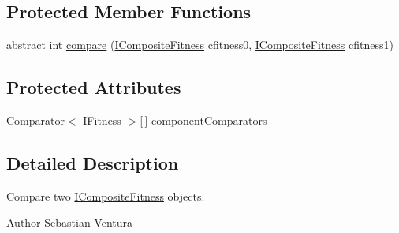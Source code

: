 \subsection*{Protected Member Functions}
\begin{DoxyCompactItemize}
\item 
abstract int \hyperlink{classnet_1_1sf_1_1jclec_1_1fitness_1_1_composite_fitness_comparator_a6c060cd511a694dc0953e42ab05a4419}{compare} (\hyperlink{interfacenet_1_1sf_1_1jclec_1_1fitness_1_1_i_composite_fitness}{I\-Composite\-Fitness} cfitness0, \hyperlink{interfacenet_1_1sf_1_1jclec_1_1fitness_1_1_i_composite_fitness}{I\-Composite\-Fitness} cfitness1)
\end{DoxyCompactItemize}
\subsection*{Protected Attributes}
\begin{DoxyCompactItemize}
\item 
Comparator$<$ \hyperlink{interfacenet_1_1sf_1_1jclec_1_1_i_fitness}{I\-Fitness} $>$\mbox{[}$\,$\mbox{]} \hyperlink{classnet_1_1sf_1_1jclec_1_1fitness_1_1_composite_fitness_comparator_a8448c857b752923973aba83432b52253}{component\-Comparators}
\end{DoxyCompactItemize}


\subsection{Detailed Description}
Compare two \hyperlink{interfacenet_1_1sf_1_1jclec_1_1fitness_1_1_i_composite_fitness}{I\-Composite\-Fitness} objects.

\begin{DoxyAuthor}{Author}
Sebastian Ventura 
\end{DoxyAuthor}


